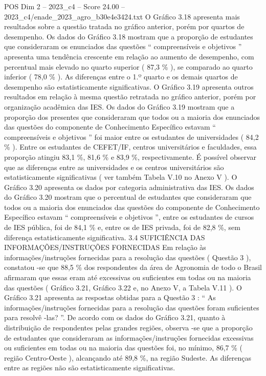 \begin{textsample}{POS Dim 2 – 2023\_c4 – Score 24.00 – 2023\_c4/enade\_2023\_agro\_b30e4e3424.txt}
O Gráfico 3.18 apresenta mais resultados sobre a questão tratada no gráfico anterior, porém por quartos de desempenho.
Os dados do Gráfico 3.18 mostram que a proporção de estudantes que consideraram os enunciados das questões “ compreensíveis e objetivos ” apresenta uma tendência crescente em relação ao aumento de desempenho, com percentual mais elevado no quarto superior ( 87,3 \% ), se comparado ao quarto inferior ( 78,0 \% ).
As diferenças entre o 1.º quarto e os demais quartos de desempenho são estatisticamente significativas.
O Gráfico 3.19 apresenta outros resultados em relação à mesma questão retratada no gráfico anterior, porém por organização acadêmica das IES.
Os dados do Gráfico 3.19 mostram que a proporção dos presentes que consideraram que todos ou a maioria dos enunciados das questões do componente de Conhecimento Específico estavam “ compreensíveis e objetivos ” foi maior entre os estudantes de universidades ( 84,2 \% ).
Entre os estudantes de CEFET/IF, centros universitários e faculdades, essa proporção atingiu 83,1 \%, 81,6 \% e 83,9 \%, respectivamente.
É possível observar que as diferenças entre as universidades e os centros universitários são estatisticamente significativas ( ver também Tabela V.10 no Anexo V ).
O Gráfico 3.20 apresenta os dados por categoria administrativa das IES.
Os dados do Gráfico 3.20 mostram que o percentual de estudantes que consideraram que todos ou a maioria dos enunciados das questões do componente de Conhecimento Específico estavam “ compreensíveis e objetivos ”, entre os estudantes de cursos de IES pública, foi de 84,1 \% e, entre os de IES privada, foi de 82,8 \%, sem diferença estatisticamente significativa. 3.4 SUFICIÊNCIA DAS INFORMAÇÕES/INSTRUÇÕES FORNECIDAS Em relação às informações/instruções fornecidas para a resolução das questões ( Questão 3 ), constatou -se que 88,5 \% dos respondentes da área de Agronomia de todo o Brasil afirmaram que essas eram até excessivas ou suficientes em todas ou na maioria das questões ( Gráfico 3.21, Gráfico 3.22 e, no Anexo V, a Tabela V.11 ).
O Gráfico 3.21 apresenta as respostas obtidas para a Questão 3 : “ As informações/instruções fornecidas para a resolução das questões foram suficientes para resolvê -las? ”.
De acordo com os dados do Gráfico 3.21, quanto à distribuição de respondentes pelas grandes regiões, observa -se que a proporção de estudantes que consideraram as informações/instruções fornecidas excessivas ou suficientes em todas ou na maioria das questões foi, no mínimo, 86,7 \% ( região Centro-Oeste ), alcançando até 89,8 \%, na região Sudeste.
As diferenças entre as regiões não são estatisticamente significativas.

\end{textsample}
